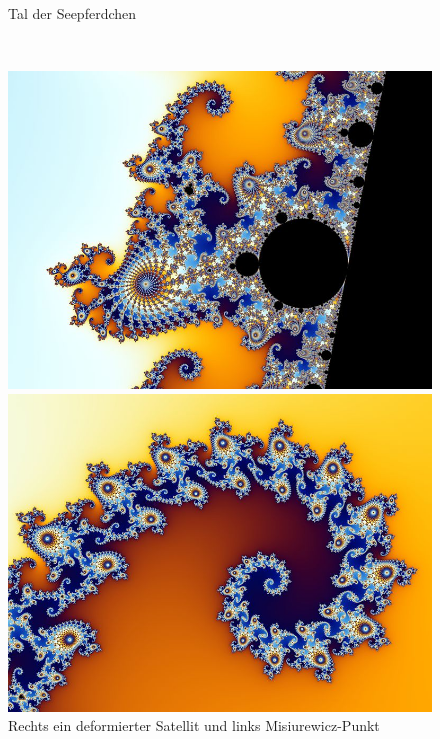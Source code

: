 \begin{figure}[H]
\begin{minipage}[t]{0.40\textwidth}
    \vspace*{-4ex}
    \caption{\grqq Tal der Seepferdchen\glqq~\cite{beyer_partial_2005-1}}
    \label{app:6.2}
  \end{minipage}
  \\[4ex]
  \begin{minipage}[t]{0.40\textwidth}
    \centering
    \includegraphics[width=\linewidth]{images/zoom/800px-Mandel_zoom_03_seehorse}
    \vspace*{-4ex}
    \caption{Rechts ein deformierter Satellit und links Misiurewicz-Punkt~\cite{beyer_partial_2005-2}}
    \label{app:6.3}
  \end{minipage}%
  \hspace{8ex}
  \begin{minipage}[t]{0.40\textwidth}
    \centering
    \includegraphics[width=\linewidth]{images/zoom/800px-Mandel_zoom_04_seehorse_tail}

\end{minipage}
\end{figure}
